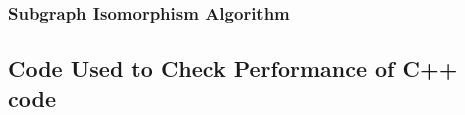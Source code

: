 \documentclass{article}
\begin{document}
    \subsubsection{Subgraph Isomorphism Algorithm}
      

  \subsection{Code Used to Check Performance of C++ code}
    

  \printbibliography[heading=bibintoc,
                     title={References}]
\end{document}
